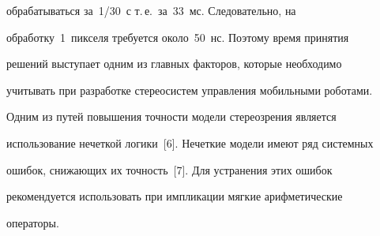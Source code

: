 обрабатываться за~1/30~с т.\,е.\ за~33~мс. Следовательно, на 


обработку~1~пикселя требуется около~50~нс. Поэтому время принятия 


решений выступает одним из главных факторов, которые необходимо 


учитывать при разработке стереосистем управления мобильными роботами. 


Одним из путей повышения точности модели стереозрения является 


использование нечеткой логики~[6]. Нечеткие модели имеют ряд системных 


ошибок, снижающих их точность~[7]. Для устранения этих ошибок 


рекомендуется использовать при импликации мягкие арифметические 


операторы.





